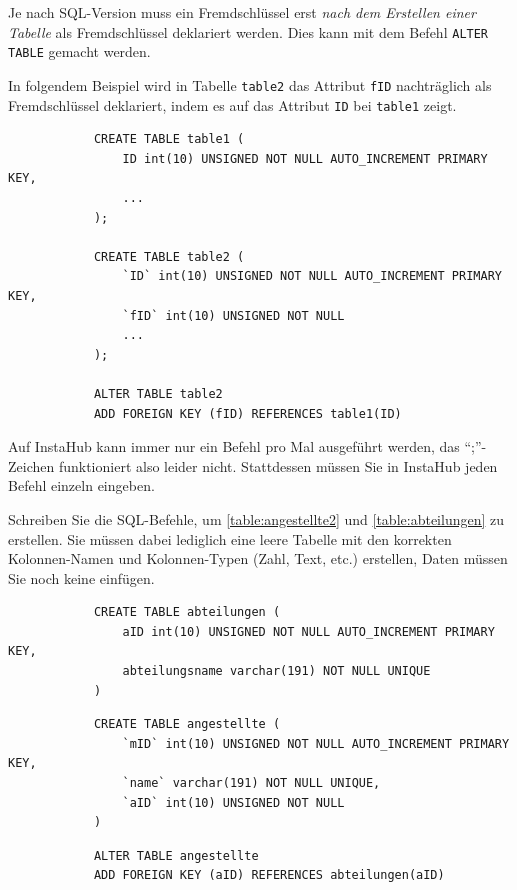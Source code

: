\begin{mycaution}
	Je nach SQL-Version muss ein Fremdschlüssel erst \textit{nach dem Erstellen einer Tabelle} als Fremdschlüssel deklariert werden. Dies kann mit dem Befehl \lstinline|ALTER TABLE| gemacht werden. 
	\begin{myexample}
		In folgendem Beispiel wird in Tabelle \lstinline|table2| das Attribut \lstinline|fID| nachträglich als Fremdschlüssel deklariert, indem es auf das Attribut \lstinline|ID| bei \lstinline|table1| zeigt.
		\begin{lstlisting}
			CREATE TABLE table1 (
				ID int(10) UNSIGNED NOT NULL AUTO_INCREMENT PRIMARY KEY,
				...
			);
			
			CREATE TABLE table2 (
				`ID` int(10) UNSIGNED NOT NULL AUTO_INCREMENT PRIMARY KEY,
				`fID` int(10) UNSIGNED NOT NULL
				...
			);
			
			ALTER TABLE table2
			ADD FOREIGN KEY (fID) REFERENCES table1(ID)
		\end{lstlisting}
	\end{myexample}
\end{mycaution}

	\begin{mycaution}
Auf InstaHub kann immer nur ein Befehl pro Mal ausgeführt werden, das \enquote{;}-Zeichen funktioniert also leider nicht. Stattdessen müssen Sie in InstaHub jeden Befehl einzeln eingeben.
	\end{mycaution}

\begin{myexercise}
	Schreiben Sie die SQL-Befehle, um \cref{table:angestellte2} und \cref{table:abteilungen} zu erstellen. Sie müssen dabei lediglich eine leere Tabelle mit den korrekten Kolonnen-Namen und Kolonnen-Typen (Zahl, Text, etc.) erstellen, Daten müssen Sie noch keine einfügen.
	\begin{myanswer}
		\begin{lstlisting}
			CREATE TABLE abteilungen (
				aID int(10) UNSIGNED NOT NULL AUTO_INCREMENT PRIMARY KEY,
				abteilungsname varchar(191) NOT NULL UNIQUE
			)
			\end{lstlisting}
			\begin{lstlisting}
			CREATE TABLE angestellte (
				`mID` int(10) UNSIGNED NOT NULL AUTO_INCREMENT PRIMARY KEY,
				`name` varchar(191) NOT NULL UNIQUE,
				`aID` int(10) UNSIGNED NOT NULL
			)
			\end{lstlisting}
		\begin{lstlisting}
			ALTER TABLE angestellte
			ADD FOREIGN KEY (aID) REFERENCES abteilungen(aID)
		\end{lstlisting}
	\end{myanswer}
\end{myexercise}

